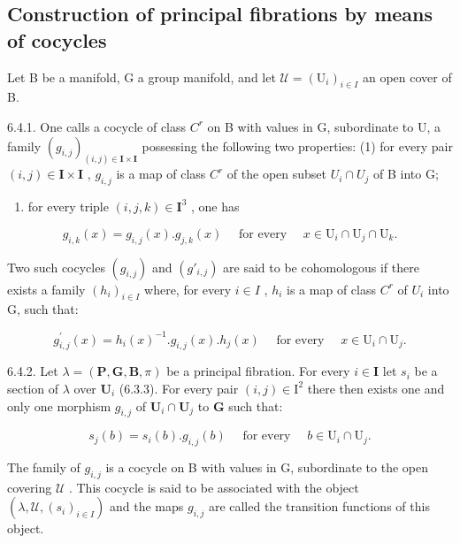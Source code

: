 \subsection{Construction of principal fibrations by means of cocycles}

Let B be a manifold, G a group manifold, and let \(\mathcal{U} = (\mathrm{U}_{i})_{i\in I}\) an open cover of B.

6.4.1. One calls a cocycle of class \(C^{r}\) on B with values in G, subordinate to U, a family \((g_{i,j})_{(i,j)\in\mathbf{I}\times\mathbf{I}}\) possessing the following two properties: (1) for every pair \((i,j)\in\mathbf{I}\times\mathbf{I}\) , \(g_{i,j}\) is a map of class \(C^{r}\) of the open subset \(U_{i}\cap U_{j}\) of B into G;

\begin{enumerate}
\def\labelenumi{(\arabic{enumi})}
\setcounter{enumi}{1}
\tightlist
\item
  for every triple \((i,j,k)\in \mathbf{I}^3\) , one has
\end{enumerate}

\[
g _ {i, k} (x) = g _ {i, j} (x). g _ {j, k} (x) \quad \text { for   every } \quad x \in \mathrm{U} _ {i} \cap \mathrm{U} _ {j} \cap \mathrm{U} _ {k}.
\]

Two such cocycles \((g_{i,j})\) and \((g'_{i,j})\) are said to be cohomologous if there exists a family \((h_{i})_{i\in I}\) where, for every \(i\in I\) , \(h_{i}\) is a map of class \(C^{r}\) of \(U_{i}\) into G, such that:

\[
g _ {i, j} ^ {\prime} (x) = h _ {i} (x) ^ {- 1}. g _ {i, j} (x). h _ {j} (x) \quad \text { for   every } \quad x \in \mathrm{U} _ {i} \cap \mathrm{U} _ {j}.\tag{3}
\]

6.4.2. Let \(\lambda = (\mathbf{P},\mathbf{G},\mathbf{B},\pi)\) be a principal fibration. For every \(i\in \mathbf{I}\) let \(s_i\) be a section of \(\lambda\) over \(\mathbf{U}_i\) (6.3.3). For every pair \((i,j)\in \mathrm{I}^2\) there then exists one and only one morphism \(g_{i,j}\) of \(\mathbf{U}_i\cap \mathbf{U}_j\) to \(\mathbf{G}\) such that:

\[
s _ {j} (b) = s _ {i} (b). g _ {i, j} (b) \quad \text { for   every } \quad b \in \mathrm{U} _ {i} \cap \mathrm{U} _ {j}.\tag{4}
\]

The family of \(g_{i,j}\) is a cocycle on B with values in G, subordinate to the open covering \(\mathcal{U}\) . This cocycle is said to be associated with the object \((\lambda, \mathcal{U}, (s_i)_{i \in I})\) and the maps \(g_{i,j}\) are called the transition functions of this object.

